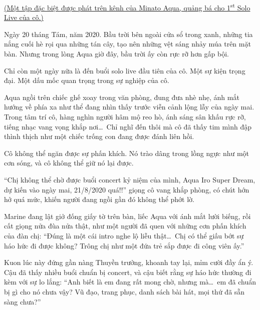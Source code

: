 \documentclass[../main.tex]{subfiles}
\begin{document}

\begin{center}
  \uline{(Một tập đặc biệt được phát trên kênh của Minato Aqua, quảng bá cho 1\textsuperscript{st} Solo Live của cô.)}
\end{center}

Ngày 20 tháng Tám, năm 2020. Bầu trời bên ngoài cửa sổ trong xanh, những tia nắng cuối hè rọi qua những tán cây, tạo nên những vệt sáng nhảy múa trên mặt bàn. Nhưng trong lòng Aqua giờ đây, bầu trời ấy còn rực rỡ hơn gấp bội.

Chỉ còn một ngày nữa là đến buổi solo live đầu tiên của cô. Một sự kiện trọng đại. Một dấu mốc quan trọng trong sự nghiệp của cô.

Aqua ngồi trên chiếc ghế xoay trong văn phòng, đung đưa nhè nhẹ, ánh mắt hướng về phía xa như thể đang nhìn thấy trước viễn cảnh lộng lẫy của ngày mai. Trong tâm trí cô, hàng nghìn người hâm mộ reo hò, ánh sáng sân khấu rực rỡ, tiếng nhạc vang vọng khắp nơi\dots\ Chỉ nghĩ đến thôi mà cô đã thấy tim mình đập thình thịch như một chiếc trống con đang được đánh liên hồi.

Cô không thể ngăn được sự phấn khích. Nó trào dâng trong lồng ngực như một cơn sóng, và cô không thể giữ nó lại được.

``Chị không thể chờ được buổi concert kỷ niệm của mình, Aqua Iro Super Dream, dự kiến vào ngày mai, 21/8/2020 quá!!'' giọng cô vang khắp phòng, có chút hớn hở quá mức, khiến người đang ngồi gần đó không thể phớt lờ.

Marine đang lật giở đống giấy tờ trên bàn, liếc Aqua với ánh mắt lười biếng, rồi cất giọng nửa đùa nửa thật, như một người đã quen với những cơn phấn khích của đàn chị: ``Đúng là một cái intro nghe lộ liễu thật\dots\ Chị có thể giấu bớt sự háo hức đi được không? Trông chị như một đứa trẻ sắp được đi công viên ấy.''


Kuon lúc này đứng gần nàng Thuyền trưởng, khoanh tay lại, mỉm cười đầy ẩn ý. Cậu đã thấy nhiều buổi chuẩn bị concert, và cậu biết rằng sự háo hức thường đi kèm với sự lo lắng: ``Anh biết là em đang rất mong chờ, nhưng mà\dots\ em đã chuẩn bị gì cho nó chưa vậy? Vũ đạo, trang phục, danh sách bài hát, mọi thứ đã sẵn sàng chưa?''
\end{document}
